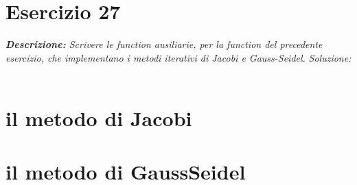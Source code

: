\section{Esercizio 27}
\textit{\textbf{Descrizione:}  Scrivere le function ausiliarie, per la function del precedente esercizio, che implementano i metodi iterativi di Jacobi e Gauss-Seidel.}\newline
\emph{Soluzione: }\\~\\
\section*{il metodo di Jacobi}

\section*{il metodo di GaussSeidel}
\newpage